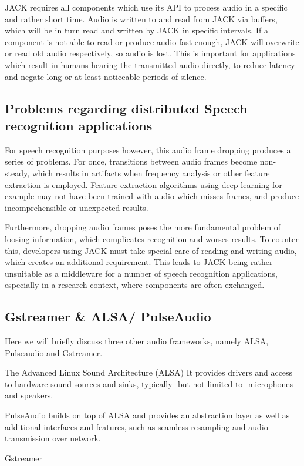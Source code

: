 JACK requires all components which use its API to process audio in a specific and rather short time. 
Audio is written to and read from JACK via buffers, which will be in turn read and written by JACK in specific intervals.
If a component is not able to read or produce audio fast enough, JACK will overwrite or read old audio respectively, so audio is lost. 
This is important for applications which result in humans hearing the transmitted audio directly, to reduce latency and negate long or at least noticeable periods of silence.

\subsection{Problems regarding distributed Speech recognition applications}
For speech recognition purposes however, this audio frame dropping produces a series of problems. 
For once, transitions between audio frames become non-steady, which results in artifacts when frequency analysis or other feature extraction is employed.
Feature extraction algorithms using deep learning for example may not have been trained with audio which misses frames, and produce incomprehensible or unexpected results.

Furthermore, dropping audio frames poses the more fundamental problem of loosing information, which complicates recognition and worses results. 
To counter this, developers using JACK must take special care of reading and writing audio, which creates an additional requirement.
This leads to JACK being rather unsuitable as a middleware for a number of speech recognition applications, especially in a research context, where components are often exchanged.

\subsection{Gstreamer \& ALSA/ PulseAudio}

Here we will briefly discuss three other audio frameworks, namely ALSA, Pulseaudio and Gstreamer.

The Advanced Linux Sound Architecture (ALSA) 
It provides drivers and access to hardware sound sources and sinks, typically -but not limited to- microphones and speakers.

PulseAudio builds on top of ALSA and provides an abstraction layer as well as additional interfaces and features, such as seamless resampling and audio transmission over network.

Gstreamer \cite{Gstreamer}

